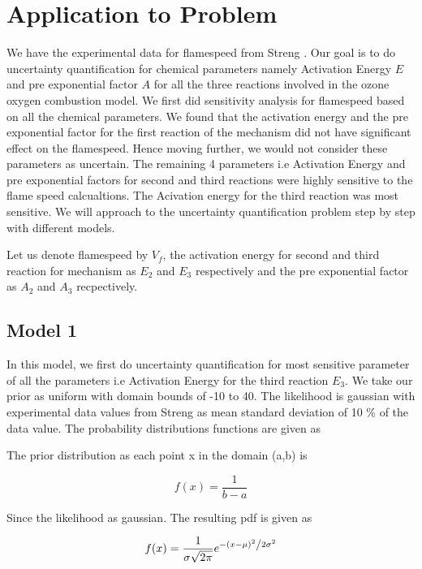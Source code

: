 \section{Application to Problem}

\noindent We have the experimental data for flamespeed from Streng \cite{Streng}. Our goal is to do uncertainty quantification for chemical parameters namely Activation Energy $ E $ and pre exponential factor $ A $ for all the three reactions involved in the ozone oxygen combustion model. We first did sensitivity analysis for flamespeed based on all the chemical parameters. We found that the activation energy and the pre exponential factor for the first reaction of the mechanism did not have significant effect on the flamespeed. Hence moving further, we would not consider these parameters as uncertain. The remaining 4 parameters i.e Activation Energy and pre exponential factors for second and third reactions were highly sensitive to the flame speed calcualtions. The Acivation energy for the third reaction was most sensitive. We will approach to the uncertainty quantification problem step by step with different models.  

\noindent Let us denote flamespeed by $V_f$, the activation energy for second and third reaction for mechanism as $E_2$ and $E_3$ respectively and the pre exponential factor as $A_2$ and $A_3$ recpectively. 


\subsection{Model 1}
\noindent In this model, we first do uncertainty quantification for most sensitive parameter of all the parameters i.e Activation Energy for the third reaction $E_3$. We take our prior as uniform with domain bounds of -10 to 40. The likelihood is gaussian with experimental data values from Streng\cite{Streng} as mean standard deviation of 10 \% of the data value. The probability distributions functions are given as

\nonident The prior distribution as each point x in the domain (a,b) is 

$$f(x) = \frac{1}{b -a}$$


\noindent Since the likelihood as gaussian. The resulting pdf is given as 

$$f(x) = \frac{1}{{\sigma \sqrt {2\pi } }}e^{{{ - \left( {x - \mu } \right)^2 } \mathord{\left/ {\vphantom {{ - \left( {x - \mu } \right)^2 } {2\sigma ^2 }}} \right. \kern-\nulldelimiterspace} {2\sigma ^2 }}} $$

